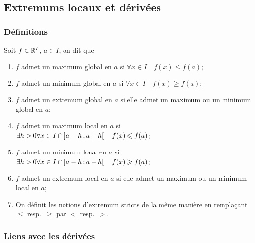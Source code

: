 \subsection{Extremums locaux et dérivées}

\subsubsection{Définitions}

Soit \(f \in \mathbb{R}^I\), \(a \in I\), on dit que
\begin{enumerate}
\item \(f\) admet un maximum global en \(a\) si \(\forall x \in I \quad f(x) \leqslant f(a)\);
\item \(f\) admet un minimum global en \(a\) si \(\forall x \in I \quad f(x) \geqslant f(a)\);
\item \(f\) admet un extremum global en \(a\) si elle admet un maximum ou un minimum global en \(a\);
\item \(f\) admet un maximum local en \(a\) si \(\exists h > 0 \forall x \in I \cap \left] a-h \, ;  a+h \right[  \quad f(x) \leqslant f(a)\);
\item \(f\) admet un minimum local en \(a\) si \(\exists h > 0 \forall x \in I \cap \left] a-h \, ;  a+h \right[ \quad f(x) \geqslant f(a)\);
\item \(f\) admet un extremum local en \(a\) si elle admet un maximum ou un minimum local en \(a\);
\item On définit les notions d'extremum stricts de la même manière en remplaçant \(\leqslant\) resp.\ \(\geqslant\) par \(<\) resp.\ \(>\).
\end{enumerate}

\subsubsection{Liens avec les dérivées}

